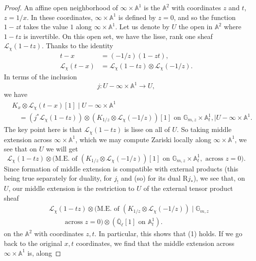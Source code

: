 \begin{proof}
An affine open neighborhood of \(\infty\times\mathbb{A}^1\) is the
\(\mathbb{A}^2\) with coordinates \(z\) and \(t\), \(z=1/x\). In these
coordinates, \(\infty\times\mathbb{A}^1\) is defined by \(z=0\), and so the
function \(1-zt\) takes the value \(1\) along \(\infty\times\mathbb{A}^1\). Let
us denote by \(U\) the open in \(\mathbb{A}^2\) where \(1-tz\) is invertible.
On this open set, we have the lisse, rank one sheaf
\(\mathcal{L}_\chi(1-tz)\). Thanks to the identity
\[
  \begin{aligned}
    t-x &= (-1/z)(1-zt),\\
    \mathcal{L}_\chi(t-x)
      &= \mathcal{L}_\chi(1-tz)\otimes\mathcal{L}_\chi(-1/z).
  \end{aligned}
\]
In terms of the inclusion
\[
  j:U-\infty\times\mathbb{A}^1\to U,
\]
we have
\[
  \begin{aligned}
    &K_x\otimes\mathcal{L}_\chi(t-x)[1]
    \mid U-\infty\times\mathbb{A}^1\\
    &\quad =
    (j^*\mathcal{L}_\chi(1-tz))
    \otimes(K_{1/z}\otimes\mathcal{L}_\chi(-1/z))[1]
    \text{ on }\mathbb{G}_{m,z}\times\mathbb{A}^1_t,
    \mid U-\infty\times\mathbb{A}^1.
  \end{aligned}
\]
The key point here is that \(\mathcal{L}_\chi(1-tz)\) is lisse on all of
\(U\). So taking middle extension across \(\infty\times\mathbb{A}^1\), which
we may compute Zariski locally along \(\infty\times\mathbb{A}^1\), we see that
on \(U\) we will get
\[
  \mathcal{L}_\chi(1-tz)\otimes
  \bigl(\text{M.E. of }(K_{1/z}\otimes\mathcal{L}_\chi(-1/z))[1]
  \text{ on }\mathbb{G}_{m,z}\times\mathbb{A}^1_t,
  \text{ across }z=0\bigr).
\]
Since formation of middle extension is compatible with external products
(this being true separately for duality, for \(j_!\) and (so) for its dual
\(\mathrm{R}j_*\)), we see that, on \(U\), our middle extension is
the restriction to \(U\) of the external tensor product sheaf
\[
  \begin{aligned}
    &\mathcal{L}_\chi(1-tz)\otimes
    \bigl(\text{M.E. of }(K_{1/z}\otimes\mathcal{L}_\chi(-1/z))
    \mid\mathbb{G}_{m,z}\\
    &\qquad\text{ across }z=0\bigr)
    \otimes(\overline{\mathbb{Q}}_\ell[1]\text{ on }\mathbb{A}^1_t).
  \end{aligned}
\]
on the \(\mathbb{A}^2\) with coordinates \(z,t\). In particular, this shows
that (1) holds. If we go back to the original \(x,t\) coordinates, we find
that the middle extension across \(\infty\times\mathbb{A}^1\) is, along

\end{proof}
